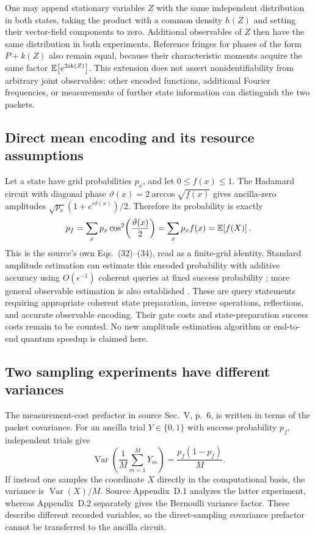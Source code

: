 One may append stationary variables $Z$ with the same independent
distribution in both states, taking the product with a common density
$h(Z)$ and setting their vector-field components to zero. Additional
observables of $Z$ then have the same distribution in both experiments.
Reference fringes for phases of the form $P+k(Z)$ also remain equal,
because their characteristic moments acquire the same factor
$\mathbb E\!\left[e^{2ik(Z)}\right]$. This extension does not assert nonidentifiability from
arbitrary joint observables: other encoded functions, additional Fourier
frequencies, or measurements of further state information can distinguish
the two packets.

\subsection{Direct mean encoding and its resource assumptions}
Let a state have grid probabilities $p_x$, and let $0\leq f(x)\leq1$.
The Hadamard circuit with diagonal phase
$\vartheta(x)=2\arccos\sqrt{f(x)}$ gives ancilla-zero amplitudes
$\sqrt{p_x}(1+e^{i\vartheta(x)})/2$. Therefore its probability is exactly
\begin{equation}
 p_f=\sum_xp_x\cos^2\!\left(\frac{\vartheta(x)}2\right)
     =\sum_xp_xf(x)=\mathbb E\!\left[f(X)\right].
 \label{eq:direct-mean-probability}
\end{equation}
This is the source's own Eqs.~(32)--(34), read as a finite-grid identity.
Standard amplitude estimation can estimate this encoded probability
with additive accuracy using $O(\epsilon^{-1})$ coherent queries at fixed
success probability \cite{bhmt,aaronsonrall}; more general observable
estimation is also established \cite{rall}. These are query statements
requiring appropriate coherent state preparation, inverse operations,
reflections, and accurate observable encoding. Their gate costs and
state-preparation success costs remain to be counted. No new amplitude
estimation algorithm or end-to-end quantum speedup is claimed here.

\subsection{Two sampling experiments have different variances}
The measurement-cost prefactor in source Sec.~V, p.~6, is written in
terms of the packet covariance. For an ancilla trial $Y\in\{0,1\}$
with success probability $p_f$, independent trials give
\begin{equation}
 \operatorname{Var}\!\left(\frac1M\sum_{m=1}^MY_m\right)
 =\frac{p_f(1-p_f)}{M}.
 \label{eq:ancilla-variance}
\end{equation}
If instead one samples the coordinate $X$ directly in the computational
basis, the variance is $\operatorname{Var}(X)/M$. Source Appendix~D.1
analyzes the latter experiment, whereas Appendix~D.2 separately gives
the Bernoulli variance factor. These describe different recorded
variables, so the direct-sampling covariance prefactor cannot be
transferred to the ancilla circuit.

